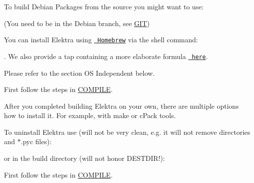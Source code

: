 \begin{DoxyCode}{0}
\end{DoxyCode}


To build Debian Packages from the source you might want to use\+:


\begin{DoxyCode}{0}
\end{DoxyCode}


(You need to be in the Debian branch, see \mbox{\hyperlink{doc_GIT_md}{G\+IT}})

You can install Elektra using \href{http://brew.sh}{\texttt{ Homebrew}} via the shell command\+:


\begin{DoxyCode}{0}
\end{DoxyCode}


. We also provide a tap containing a more elaborate formula \href{http://github.com/ElektraInitiative/homebrew-elektra}{\texttt{ here}}.

Please refer to the section OS Independent below.

First follow the steps in \mbox{\hyperlink{doc_COMPILE_md}{C\+O\+M\+P\+I\+LE}}.

After you completed building Elektra on your own, there are multiple options how to install it. For example, with make or c\+Pack tools.


\begin{DoxyCode}{0}
\end{DoxyCode}


To uninstall Elektra use (will not be very clean, e.\+g. it will not remove directories and {\ttfamily $\ast$.pyc} files)\+:


\begin{DoxyCode}{0}
\end{DoxyCode}


or in the build directory (will not honor {\ttfamily D\+E\+S\+T\+D\+IR}!)\+:


\begin{DoxyCode}{0}
\end{DoxyCode}


First follow the steps in \mbox{\hyperlink{doc_COMPILE_md}{C\+O\+M\+P\+I\+LE}}.

